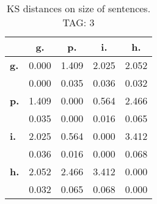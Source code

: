 \begin{table}[h!]
\begin{center}
\begin{tabular}{| l || c | c | c | c |}\hline
 & {\bf g.} & {\bf p.} & {\bf i.} & {\bf h.} \\\hline\hline
{\bf g.} & 0.000 & 1.409 & 2.025 & 2.052 \\
{\bf } & 0.000 & 0.035 & 0.036 & 0.032 \\\hline
{\bf p.} & 1.409 & 0.000 & 0.564 & 2.466 \\
{\bf } & 0.035 & 0.000 & 0.016 & 0.065 \\\hline
{\bf i.} & 2.025 & 0.564 & 0.000 & 3.412 \\
{\bf } & 0.036 & 0.016 & 0.000 & 0.068 \\\hline
{\bf h.} & 2.052 & 2.466 & 3.412 & 0.000 \\
{\bf } & 0.032 & 0.065 & 0.068 & 0.000 \\\hline
\end{tabular}
\caption{KS distances on size of sentences. TAG: 3}
\end{center}
\end{table}